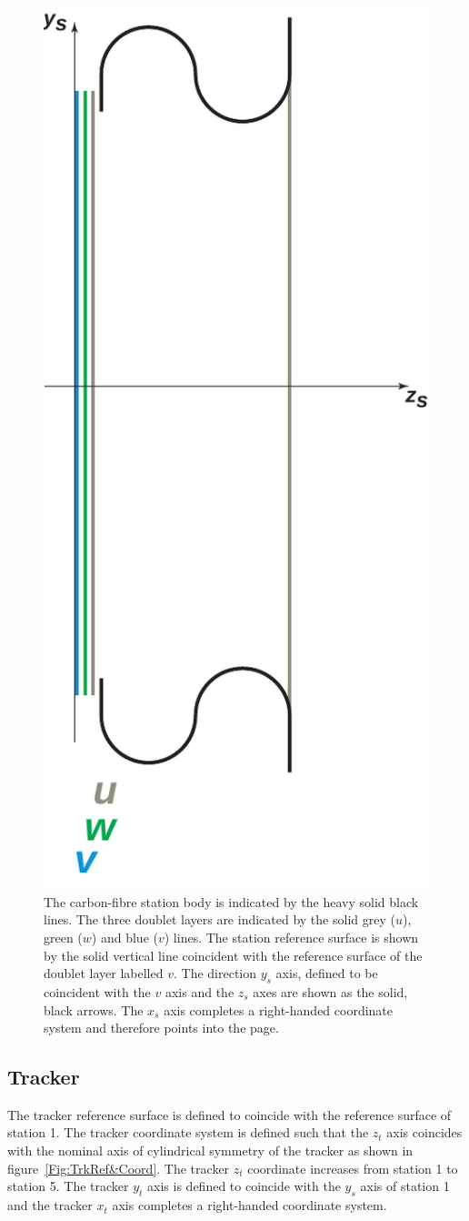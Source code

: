 \begin{figure}
  \begin{center}
    \includegraphics[width=0.22\linewidth]{detectors/tracker/03-Reference-surfaces-and-coordinate-systems/Figures/station.pdf}
  \end{center}
  \caption{The carbon-fibre station body is indicated by the heavy solid black lines. The three doublet layers are indicated by the solid grey ($u$), green ($w$) and blue ($v$) lines. The station reference surface is shown by the solid vertical line coincident with the reference surface of the doublet layer labelled $v$. The direction $y_s$ axis, defined to be coincident with the $v$ axis and the $z_s$ axes are shown as the solid, black arrows. The $x_s$ axis completes a right-handed coordinate system and therefore points into the page. }
  \label{Fig:StnRef&Coord}
\end{figure}

\subsection{Tracker}
\label{SubSect:SciFiTrkrCoordStn}

The tracker reference surface is defined to coincide with the reference surface of station 1. The tracker coordinate system is defined such that the $z_t$ axis coincides with the nominal axis of cylindrical symmetry of the tracker as shown in figure~\ref{Fig:TrkRef&Coord}. The tracker $z_t$ coordinate increases from station 1 to station 5. The tracker $y_t$ axis is defined to coincide with the $y_s$ axis of station 1 and the tracker $x_t$ axis completes a right-handed coordinate system.

